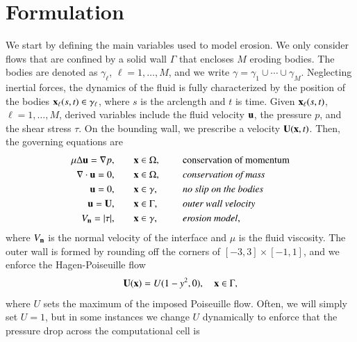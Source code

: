 \documentclass[preprint, 10pt]{elsarticle}
\begin{document}
\section{Formulation}
\label{s:formulation}
We start by defining the main variables used to model erosion.  We only
consider flows that are confined by a solid wall $\Gamma$ that encloses
$M$ eroding bodies.  The bodies are denoted as $\gamma_\ell$,
$\ell=1,\ldots,M$, and we write $\gamma = \gamma_1 \cup \cdots \cup
\gamma_M$.  Neglecting inertial forces, the dynamics of the fluid is
fully characterized by the position of the bodies ${\mathbf{x}}_\ell(s,t) \in
\gamma_\ell$, where $s$ is the arclength and $t$ is time.  Given
${\mathbf{x}}_\ell(s,t)$, $\ell=1,\ldots,M$, derived variables include the fluid
velocity ${\mathbf{u}}$, the pressure $p$, and the shear stress $\tau$.   On the
bounding wall, we prescribe a velocity ${\mathbf{U}}({\mathbf{x}},t)$.  Then, the
governing equations are
\begin{equation}
\label{eqn:erosionModel}
\begin{split}
  \mu \Delta {\mathbf{u}} = {\nabla} p, &\hspace{20pt} {\mathbf{x}} \in \Omega, \hspace*{.2in} &&\mbox{conservation
of momentum}\\
{\nabla} \cdot {\mathbf{u}} = 0, &\hspace{20pt} {\mathbf{x}} \in \Omega, \hspace*{.2in}
&&\mbox{\em conservation of mass} \\
{\mathbf{u}} = 0, &\hspace{20pt} {\mathbf{x}} \in \gamma, \hspace*{.2in} &&\mbox{\em no slip on the
bodies} \\
{\mathbf{u}} = {\mathbf{U}}, &\hspace{20pt} {\mathbf{x}} \in \Gamma, \hspace*{.2in} &&\mbox{\em outer wall
velocity} \\
V_{\mathbf{n}} = \lvert \tau \rvert, &\hspace{20pt} {\mathbf{x}} \in \gamma,
&&\mbox{\em erosion model},
\end{split}
\end{equation}
where $V_{\mathbf{n}}$ is the normal velocity of the interface and $\mu$ is the
fluid viscosity.  The outer wall is formed by rounding off the corners
of $[-3,3] \times [-1,1]$, and we enforce the Hagen-Poiseuille flow
\begin{align*}
  {\mathbf{U}}({\mathbf{x}}) = U (1-y^2,0), \quad {\mathbf{x}} \in \Gamma,
\end{align*}
where $U$ sets the maximum of the imposed Poiseuille flow. Often, we
will simply set $U=1$, but in some instances we change $U$ dynamically
to enforce that the pressure drop across the computational cell is
\end{document}
